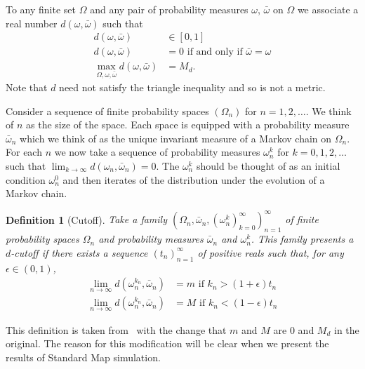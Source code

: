 \documentclass[twocolumn,10pt]{asme2e}
\newtheorem{definition}{Definition}
\begin{document}
To any finite set $\Omega$ and any pair of probability measures
$\omega$, $\bar{\omega}$ on $\Omega$ we associate a real number
$d(\omega,\bar{\omega})$ such that
\begin{subequations}
\label{eqn:defn_d}
\begin{align}
d(\omega,\bar{\omega}) &\in [0,1] \\
d(\omega,\bar{\omega}) &= 0 \text{ if and only if } \bar{\omega}=\omega \\
\max_{\Omega,\omega,\bar{\omega}} d(\omega,\bar{\omega}) &= M_d.
\end{align}
\end{subequations}
Note that $d$ need not satisfy the triangle inequality and so is not a
metric.

Consider a sequence of finite probability spaces $(\Omega_n)$ for $n =
1,2,\ldots$. We think of $n$ as the size of the space. Each space is
equipped with a probability measure $\bar{\omega}_n$ which we think of
as the unique invariant measure of a Markov chain on $\Omega_n$. For
each $n$ we now take a sequence of probability measures $\omega_n^k$
for $k = 0,1,2,\ldots$ such that
$\lim_{k \rightarrow \infty} d(\omega_n,\bar{\omega}_n)=0$.
The $\omega_n^k$ should be thought of as an initial condition
$\omega_n^0$ and then iterates of the distribution under the
evolution of a Markov chain.
\begin{definition}[Cutoff]
\label{cutoffdefinitionn}
Take a family $(\Omega_n,\bar{\omega}_n,
(\omega^k_n)_{k=0}^{\infty})_{n=1}^{\infty}$ of finite probability
spaces $\Omega_n$ and probability measures $\bar{\omega}_n$ and
$\omega_n^k$. This family presents a $d$-cutoff if there exists a
sequence $(t_n)_{n=1}^{\infty}$ of positive reals such that, for any
$\epsilon \in (0,1)$,
\begin{subequations}
  \label{eqn:defn_cutoff}
  \begin{align}
    \label{eqn:defn_cutoff_1}
    \lim_{n \rightarrow \infty}d(\omega^{k_n}_n,\bar{\omega}_n) &= m \text{ if }
    k_n > (1+\epsilon)t_n \\
    \lim_{n \rightarrow \infty}d(\omega^{k_n}_n,\bar{\omega}_n) &= M \text{ if }
    k_n < (1-\epsilon)t_n
  \end{align}
\end{subequations}
\end{definition}



This definition is taken from~\cite{Diaconis2005} with the change that
$m$ and $M$ are $0$ and $M_d$ in the original. The reason for this
modification will be clear when we present the results of Standard Map
simulation.
\end{document}
